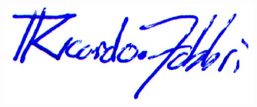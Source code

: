 \documentclass[a4paper,titlepage]{article}
\begin{document}

%

%
  \includegraphics[width=0.2\linewidth]{figs/signature-extensive.png}\\[-4em]
\end{document}
